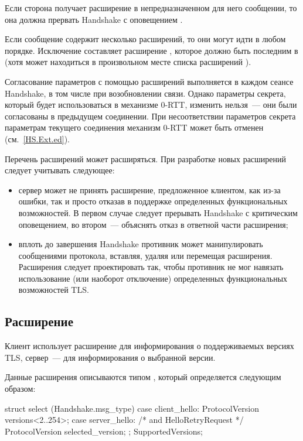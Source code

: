 Если сторона получает расширение в непредназначенном для него сообщении,
то она должна прервать Handshake с оповещением 
. 

Если сообщение содержит несколько расширений, то они могут идти в любом 
порядке. Исключение составляет расширение , 
которое должно быть последним в  (хотя может 
находиться в произвольном месте списка расширений ).

Согласование параметров с помощью расширений выполняется в каждом сеансе 
Handshake, в том числе при возобновлении связи. 
%
Однако параметры секрета, который будет использоваться в механизме 0-RTT, 
изменить нельзя~--- они были согласованы в предыдущем соединении. При 
несоответствии параметров секрета параметрам текущего соединения механизм 0-RTT 
может быть отменен (см.~\ref{HS.Ext.ed}).

Перечень расширений может расширяться. При разработке новых расширений 
следует учитывать следующее:

\begin{itemize}
\item
сервер может не принять расширение, предложенное клиентом, как из-за ошибки, 
так и просто отказав в поддержке определенных функциональных возможностей. 
В первом случае следует прерывать Handshake с критическим оповещением, во 
втором~--- объяснять отказ в ответной части расширения;
\item
вплоть до завершения Handshake противник может манипулировать сообщениями 
протокола, вставляя, удаляя или перемещая расширения. Расширения следует 
проектировать так, чтобы противник не мог навязать использование (или наоборот 
отключение) определенных функциональных возможностей TLS. 
\end{itemize}

\subsection{Расширение }\label{HS.Ext.sv} 

Клиент использует расширение  для информирования о 
поддерживаемых версиях TLS, сервер~--- для информирования о выбранной версии. 

Данные расширения  описываются типом 
, который определяется следующим образом:

\begin{codeblock}
struct {
  select (Handshake.msg_type) {
    case client_hello:
      ProtocolVersion versions<2..254>;
    case server_hello: /* and HelloRetryRequest */
      ProtocolVersion selected_version;
  };
} SupportedVersions;
\end{codeblock}

